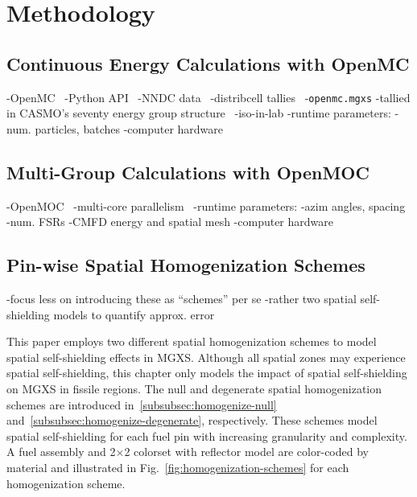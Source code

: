 \section{Methodology}
\label{sec:methodology}

\subsection{Continuous Energy Calculations with OpenMC}
\label{subsec:openmc}

-OpenMC~\cite{romano2013openmc}
-Python API~\cite{boyd2016bigdata}
-NNDC data~\cite{nndc2016endf}
-distribcell tallies~\cite{lax2014distribcell}
-\texttt{openmc.mgxs}
  -tallied in CASMO's seventy energy group structure~\cite{rhodes2006casmo}
-iso-in-lab
-runtime parameters:
  -num. particles, batches
  -computer hardware

\subsection{Multi-Group Calculations with OpenMOC}
\label{subsec:openmoc}

-OpenMOC~\cite{boyd2014openmoc}
-multi-core parallelism~\cite{boyd2016parallel}
-runtime parameters:
  -azim angles, spacing
  -num. FSRs
  -CMFD energy and spatial mesh
  -computer hardware


\subsection{Pin-wise Spatial Homogenization Schemes}
\label{subsec:homogenize}

-focus less on introducing these as ``schemes'' per se
  -rather two spatial self-shielding models to quantify approx. error

This paper employs two different spatial homogenization schemes to model spatial self-shielding effects in MGXS. Although all spatial zones may experience spatial self-shielding, this chapter only models the impact of spatial self-shielding on MGXS in fissile regions. The null and degenerate spatial homogenization schemes are introduced in~\autoref{subsubsec:homogenize-null} and~\autoref{subsubsec:homogenize-degenerate}, respectively. These schemes model spatial self-shielding for each fuel pin with increasing granularity and complexity. A fuel assembly and 2$\times$2 colorset with reflector model are color-coded by material and illustrated in Fig.~\ref{fig:homogenization-schemes} for each homogenization scheme.

